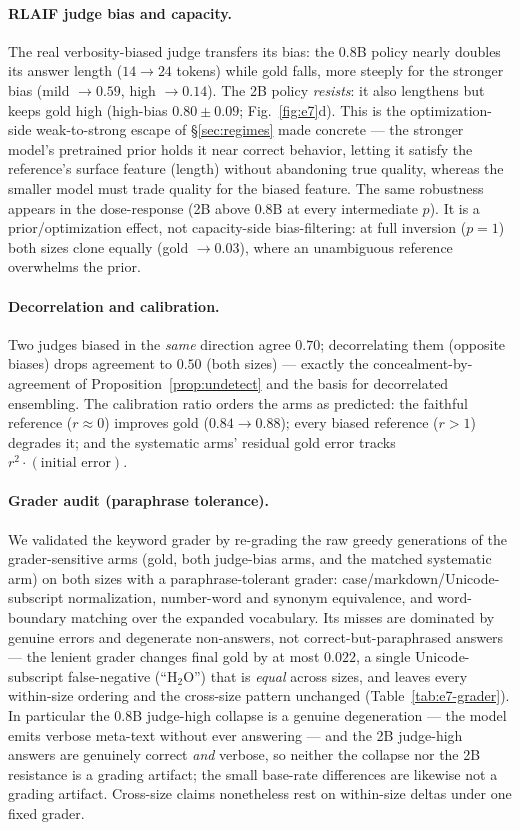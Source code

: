 \documentclass[10pt]{article} %
\theoremstyle{plain}
\theoremstyle{remark}
\begin{document}
\paragraph{RLAIF judge bias and capacity.} The real verbosity-biased judge transfers its bias: the 0.8B policy nearly doubles its answer length ($14\to24$ tokens) while gold falls, more steeply for the stronger bias (mild $\to0.59$, high $\to0.14$). The 2B policy \emph{resists}: it also lengthens but keeps gold high (high-bias $0.80\pm0.09$; Fig.~\ref{fig:e7}d). This is the optimization-side weak-to-strong escape of \S\ref{sec:regimes} made concrete --- the stronger model's pretrained prior holds it near correct behavior, letting it satisfy the reference's surface feature (length) without abandoning true quality, whereas the smaller model must trade quality for the biased feature. The same robustness appears in the dose-response (2B above 0.8B at every intermediate $p$). It is a prior/optimization effect, not capacity-side bias-filtering: at full inversion ($p=1$) both sizes clone equally (gold $\to0.03$), where an unambiguous reference overwhelms the prior.

\paragraph{Decorrelation and calibration.} Two judges biased in the \emph{same} direction agree $0.70$; decorrelating them (opposite biases) drops agreement to $0.50$ (both sizes) --- exactly the concealment-by-agreement of Proposition~\ref{prop:undetect} and the basis for decorrelated ensembling. The calibration ratio orders the arms as predicted: the faithful reference ($r\approx0$) improves gold ($0.84\to0.88$); every biased reference ($r>1$) degrades it; and the systematic arms' residual gold error tracks $r^2\cdot(\text{initial error})$.

\paragraph{Grader audit (paraphrase tolerance).} We validated the keyword grader by re-grading the raw greedy generations of the grader-sensitive arms (gold, both judge-bias arms, and the matched systematic arm) on both sizes with a paraphrase-tolerant grader: case/markdown/Unicode-subscript normalization, number-word and synonym equivalence, and word-boundary matching over the expanded vocabulary. Its misses are dominated by genuine errors and degenerate non-answers, not correct-but-paraphrased answers --- the lenient grader changes final gold by at most $0.022$, a single Unicode-subscript false-negative (``H$_2$O'') that is \emph{equal} across sizes, and leaves every within-size ordering and the cross-size pattern unchanged (Table~\ref{tab:e7-grader}). In particular the 0.8B judge-high collapse is a genuine degeneration --- the model emits verbose meta-text without ever answering --- and the 2B judge-high answers are genuinely correct \emph{and} verbose, so neither the collapse nor the 2B resistance is a grading artifact; the small base-rate differences are likewise not a grading artifact. Cross-size claims nonetheless rest on within-size deltas under one fixed grader.
\end{document}
